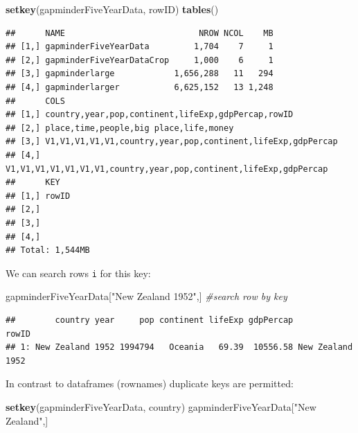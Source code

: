 \documentclass[]{article}
\newenvironment{Shaded}{\begin{snugshade}}{\end{snugshade}}
\newcommand{\KeywordTok}[1]{\textcolor[rgb]{0.13,0.29,0.53}{\textbf{{#1}}}}
\newcommand{\StringTok}[1]{\textcolor[rgb]{0.31,0.60,0.02}{{#1}}}
\newcommand{\CommentTok}[1]{\textcolor[rgb]{0.56,0.35,0.01}{\textit{{#1}}}}
\newcommand{\NormalTok}[1]{{#1}}
\begin{document}
\begin{Shaded}
\begin{Highlighting}[]
\KeywordTok{setkey}\NormalTok{(gapminderFiveYearData, rowID)}
\KeywordTok{tables}\NormalTok{()}
\end{Highlighting}
\end{Shaded}

\begin{verbatim}
##      NAME                           NROW NCOL    MB
## [1,] gapminderFiveYearData         1,704    7     1
## [2,] gapminderFiveYearDataCrop     1,000    6     1
## [3,] gapminderlarge            1,656,288   11   294
## [4,] gapminderlarger           6,625,152   13 1,248
##      COLS                                                             
## [1,] country,year,pop,continent,lifeExp,gdpPercap,rowID               
## [2,] place,time,people,big place,life,money                           
## [3,] V1,V1,V1,V1,V1,country,year,pop,continent,lifeExp,gdpPercap      
## [4,] V1,V1,V1,V1,V1,V1,V1,country,year,pop,continent,lifeExp,gdpPercap
##      KEY  
## [1,] rowID
## [2,]      
## [3,]      
## [4,]      
## Total: 1,544MB
\end{verbatim}

We can search rows \texttt{i} for this key:

\begin{Shaded}
\begin{Highlighting}[]
\NormalTok{gapminderFiveYearData[}\StringTok{"New Zealand 1952"}\NormalTok{,] }\CommentTok{#search row by key}
\end{Highlighting}
\end{Shaded}

\begin{verbatim}
##        country year     pop continent lifeExp gdpPercap            rowID
## 1: New Zealand 1952 1994794   Oceania   69.39  10556.58 New Zealand 1952
\end{verbatim}

In contrast to dataframes (rownames) duplicate keys are permitted:

\begin{Shaded}
\begin{Highlighting}[]
\KeywordTok{setkey}\NormalTok{(gapminderFiveYearData, country)}
\NormalTok{gapminderFiveYearData[}\StringTok{"New Zealand"}\NormalTok{,]}
\end{Highlighting}
\end{Shaded}
\end{document}
